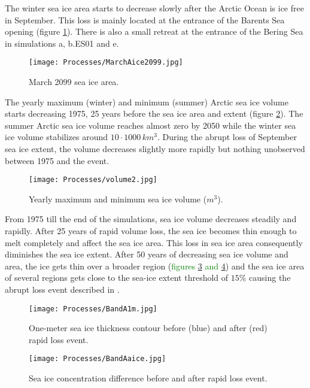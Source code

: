 The winter sea ice area starts to decrease slowly after the Arctic Ocean is ice free in September. This loss is mainly located at the entrance of the Barents Sea opening (figure \ref{march2099}). There is also a small retreat at the entrance of the Bering Sea in simulations a, b.ES01 and e. 
\begin{figure}
\center
\noindent\texttt{[image: Processes/MarchAice2099.jpg]}
\caption{March 2099 sea ice area.}
\label{march2099}
\end{figure}

The yearly maximum (winter) and minimum (summer) Arctic sea ice volume starts decreasing  1975, 25 years before the sea ice area and extent (figure \ref{icevol}). The summer Arctic sea ice volume reaches almost zero by 2050 while the winter sea ice volume stabilizes around $10 \cdot 1000 \, km^3$. During the abrupt loss of September sea ice extent, the volume decreases slightly more rapidly but nothing unobserved between 1975 and the event. 
\begin{figure}
\center
\noindent\texttt{[image: Processes/volume2.jpg]}
\caption{Yearly maximum and minimum sea ice volume ($m^3$).}
\label{icevol}
\end{figure}

From 1975 till the end of the simulations, sea ice volume decreases steadily and rapidly. After 25 years of rapid volume loss, the sea ice becomes thin enough to melt completely and affect the sea ice area. This loss in sea ice area consequently diminishes the sea ice extent. After 50 years of decreasing sea ice volume and area, the ice gets thin over a broader region (\textcolor{green}{figures \ref{1m} and \ref{BAaice}}) and the sea ice area of several regions gets close to the sea-ice extent threshold of $15\%$ causing the abrupt loss event described in \cite{ISI:000242942100008}.

\begin{figure}
\center
\noindent\texttt{[image: Processes/BandA1m.jpg]}
\caption{One-meter sea ice thickness contour before (blue) and after (red) rapid loss event.}
\label{1m}
\end{figure}

\begin{figure}
\center
\noindent\texttt{[image: Processes/BandAaice.jpg]}
\caption{Sea ice concentration difference before and after rapid loss event.}
\label{BAaice}
\end{figure}

